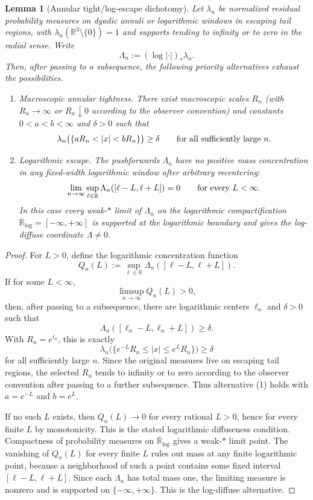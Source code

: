 \documentclass[11pt]{amsart}
\numberwithin{equation}{section}
\theoremstyle{plain}
\newtheorem{lemma}[lemma]{Lemma}
\theoremstyle{definition}
\theoremstyle{remark}
\begin{document}
\begin{lemma}[Annular tight/log-escape dichotomy]
\label{lem:annular-tight-vs-log-escape-dichotomy}
Let \(\lambda_n\) be normalized residual probability measures on dyadic
annuli or logarithmic windows in escaping tail regions, with
\(\lambda_n(\mathbb R^3\setminus\{0\})=1\) and supports tending to infinity
or to zero in the radial sense.  Write
\[
   \Lambda_n:=(\log|\cdot|)_*\lambda_n .
\]
Then, after passing to a subsequence, the following priority alternatives
exhaust the possibilities.
\begin{enumerate}[label=\textup{(\arabic*)},leftmargin=2.2em]
   \item \emph{Macroscopic annular tightness.}  There exist macroscopic
   scales \(R_n\) (with \(R_n\to\infty\) or \(R_n\downarrow0\) according to
   the observer convention) and constants \(0<a<b<\infty\) and \(\delta>0\)
   such that
   \[
      \lambda_n\bigl(\{aR_n<|x|<bR_n\}\bigr)\ge\delta
      \qquad\hbox{for all sufficiently large }n.
   \]
   \item \emph{Logarithmic escape.}  The pushforwards
   \(\Lambda_n\) have no positive mass concentration in any fixed-width
   logarithmic window after arbitrary recentering:
   \[
      \lim_{n\to\infty}
      \sup_{\ell\in\mathbb R}
      \Lambda_n([\ell-L,\ell+L])=0
      \qquad\hbox{for every }L<\infty .
   \]
   In this case every weak-\(*\) limit of \(\Lambda_n\) on the logarithmic
   compactification
   \(\overline{\mathbb R}_{\log}=[-\infty,+\infty]\) is supported at the
   logarithmic boundary and gives the log-diffuse coordinate
   \(\Lambda\ne0\).
\end{enumerate}
\end{lemma}

\begin{proof}
For \(L>0\), define the logarithmic concentration function
\[
   Q_n(L):=\sup_{\ell\in\mathbb R}\Lambda_n([\ell-L,\ell+L]).
\]
If for some \(L<\infty\),
\[
   \limsup_{n\to\infty}Q_n(L)>0,
\]
then, after passing to a subsequence, there are logarithmic centers
\(\ell_n\) and \(\delta>0\) such that
\[
   \Lambda_n([\ell_n-L,\ell_n+L])\ge\delta .
\]
With \(R_n=e^{\ell_n}\), this is exactly
\[
   \lambda_n\bigl(\{e^{-L}R_n\le |x|\le e^LR_n\}\bigr)\ge\delta
\]
for all sufficiently large \(n\).  Since the original measures live on
escaping tail regions, the selected \(R_n\) tends to infinity or to zero
according to the observer convention after passing to a further subsequence.
Thus alternative \textup{(1)} holds with \(a=e^{-L}\) and \(b=e^L\).

If no such \(L\) exists, then \(Q_n(L)\to0\) for every rational \(L>0\), hence
for every finite \(L\) by monotonicity.  This is the stated logarithmic
diffuseness condition.  Compactness of probability measures on
\(\overline{\mathbb R}_{\log}\) gives a weak-\(*\) limit point.  The vanishing
of \(Q_n(L)\) for every finite \(L\) rules out mass at any finite logarithmic
point, because a neighborhood of such a point contains some fixed interval
\([\ell-L,\ell+L]\).  Since each \(\Lambda_n\) has total mass one, the limiting
measure is nonzero and is supported on \(\{-\infty,+\infty\}\).  This is the
log-diffuse alternative.
\end{proof}
\end{document}
